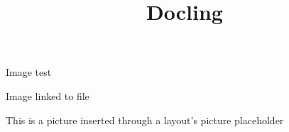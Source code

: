 \documentclass[11pt,a4paper]{article}
\title{Docling}
\begin{document}
\maketitle

Image test

\begin{figure}[h]
\end{figure}

Image linked to file

\begin{figure}[h]
\end{figure}

This is a picture inserted through a layout’s picture placeholder
\end{document}
